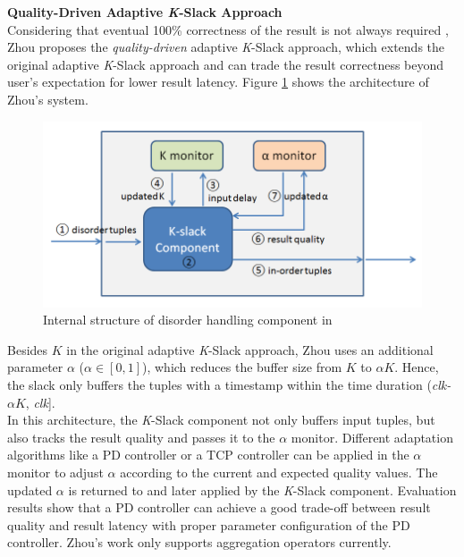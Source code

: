 \documentclass[a4paper, 11pt, twoside]{report}
\begin{document}
\noindent\textbf{Quality-Driven Adaptive \textit{K}-Slack Approach}\\

Considering that eventual 100\% correctness of the result is not always required \cite{abadi2003aurora}, Zhou \cite{Lisa} proposes the \textit{quality-driven} adaptive \textit{K}-Slack approach, which extends the original adaptive \textit{K}-Slack approach and can trade the result correctness beyond user's expectation for lower result latency. Figure \ref{fig:lisa_structure} shows the architecture of Zhou's system.\\

\begin{figure}[h]
\centering
\includegraphics[scale=0.55]{disorder_handling_component_internal_structure.PNG}
\caption{Internal structure of disorder handling component in \cite{Lisa} \label{fig:lisa_structure}}
\end{figure}

Besides $K$ in the original adaptive \textit{K}-Slack approach, Zhou uses an additional parameter $\alpha$ ($\alpha \in [0,1]$), which reduces the buffer size from $K$ to $\alpha K$. Hence, the slack only buffers the tuples with a timestamp within the time duration (\textit{clk-$\alpha K$}, \textit{clk}].\\

In this architecture, the \textit{K}-Slack component not only buffers input tuples, but also tracks the result quality and passes it to the $\alpha$ monitor. Different adaptation algorithms like a PD controller \cite{astrom1995pid} or a TCP controller \cite{Mutschler:2013:RSP:2488222.2488263} can be applied in the $\alpha$ monitor to adjust $\alpha$ according to the current and expected quality values. The updated $\alpha$ is returned to and later applied by the \textit{K}-Slack component. Evaluation results show that a PD controller can achieve a good trade-off between result quality and result latency with proper parameter configuration of the PD controller. Zhou's work only supports aggregation operators currently.\\
\end{document}
